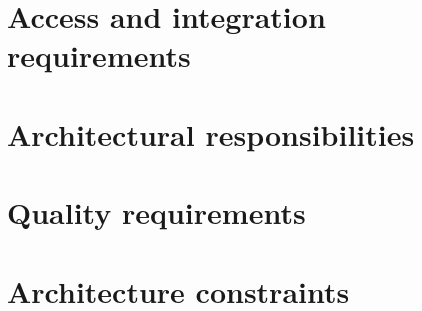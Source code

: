 \documentclass[pdftex,10pt,a4paper]{report}
\begin{document}


\newpage


\newpage
{}

\tableofcontents 

\newpage
{}


\chapter{Access and integration requirements}

\chapter{Architectural responsibilities}

\chapter{Quality requirements}

\chapter{Architecture constraints}

\end{document}
